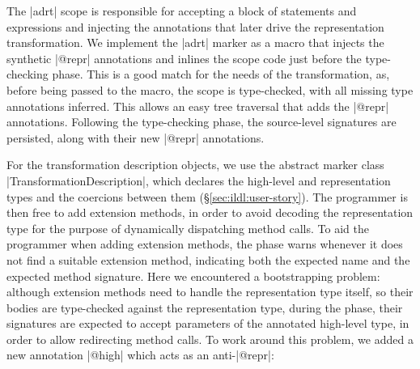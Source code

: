 The |adrt| scope is responsible for accepting a block of statements
and expressions and injecting the annotations that later drive the
representation transformation.
%
We implement the |adrt| marker as a macro that injects the synthetic
|@repr| annotations and inlines the scope code just before the
type-checking phase. This is a good match for the needs of the
transformation, as, before being passed to the macro, the scope is
type-checked, with all missing type annotations inferred. This allows
an easy tree traversal that adds the |@repr| annotations. Following
the type-checking phase, the source-level signatures are persisted,
along with their new |@repr| annotations.

For the transformation description objects, we use the
abstract marker class |TransformationDescription|, which declares the
high-level and representation types and the coercions between them
(\S\ref{sec:ildl:user-story}). The programmer is then free to add
extension methods, in order to avoid decoding the representation type
for the purpose of dynamically dispatching method calls. To aid the
programmer when adding extension methods, the \coerce{} phase warns
whenever it does not find a suitable extension method, indicating both
the expected name and the expected method signature. Here we
encountered a bootstrapping problem: although extension methods need
to handle the representation type itself, so their bodies are
type-checked against the representation type, during the \coerce{}
phase, their signatures are expected to accept parameters of the
annotated high-level type, in order to allow redirecting method
calls. To work around this problem, we added a new annotation |@high|
which acts as an anti-|@repr|:

